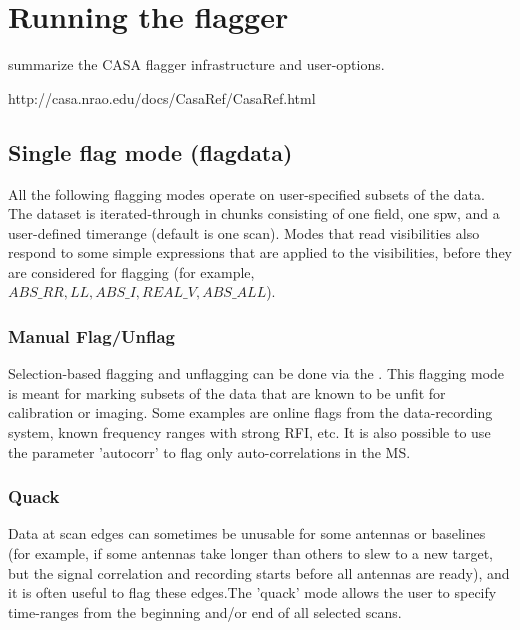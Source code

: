 
\section{Running the flagger}

summarize the CASA flagger infrastructure and user-options.

 {http://casa.nrao.edu/docs/CasaRef/CasaRef.html}


\subsection{Single flag mode (flagdata)}

All the following flagging modes operate on user-specified subsets of the data.
The dataset is iterated-through in chunks consisting of one field, one spw, and a
user-defined timerange (default is one scan). 
Modes that read visibilities also respond to some simple expressions that are applied to 
the visibilities, before they are considered for flagging 
(for example, $ABS\_RR,LL,  ABS\_I, REAL\_V,  ABS\_ALL$).

\subsubsection{Manual Flag/Unflag}

Selection-based flagging and unflagging can be done via the .  
This flagging mode is meant for marking subsets of the data that are known to be
unfit for calibration or imaging. Some examples are online flags from the data-recording system, known frequency ranges 
with strong RFI, etc. It is also possible to use the parameter 'autocorr' to
flag only auto-correlations in the MS.

\subsubsection{Quack}

Data at scan edges can sometimes be unusable for some antennas or baselines (for example, if some antennas take longer 
than others to slew to a new target, but the signal correlation and recording starts before all antennas are ready), and it 
is often useful to flag these edges.The 'quack' mode allows the user to specify time-ranges from the beginning and/or end of 
all selected scans. 

